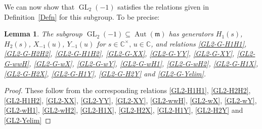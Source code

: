 \documentclass[11pt,letterpaper]{amsart}
\newcounter{thecounter}
\numberwithin{thecounter}{section}
\newtheorem{lemma}[thecounter]{Lemma}
\theoremstyle{definition}
\DeclareMathOperator{\GL}{GL}
\DeclareMathOperator{\Aut}{Aut}
\newcommand{\C}{{\mathbb C}}
\begin{document}
We can now show that $\GL_2(-1)$ satisfies the relations given in Definition~\ref{Defn} for this subgroup. To be precise:
\begin{lemma}\label{L-GL2-1}
The subgroup $\GL_2({-1})\subseteq \Aut(\mathfrak{m})$ has generators
$H_1(s)$, $H_2(s)$, $X_{-1}(u)$,  $Y_{-1}(u)$ for  $s\in\C^\times,\,u\in\C $,
and  relations \eqref{GL2-G-H1H1}, \eqref{GL2-G-H2H2}, \eqref{GL2-G-H1H2}, \eqref{GL2-G-XX}, 
\eqref{GL2-G-YY}, \eqref{GL2-G-XY}, \eqref{GL2-G-wwH}, \eqref{GL2-G-wX}, \eqref{GL2-G-wY}, \eqref{GL2-G-wH1},  
\eqref{GL2-G-wH2}, \eqref{GL2-G-H1X}, \eqref{GL2-G-H2X}, \eqref{GL2-G-H1Y},  \eqref{GL2-G-H2Y} and \eqref{GL2-G-Yelim}.
\end{lemma}

\begin{longver}
\begin{proof} These follow from the corresponding relations \eqref{GL2-H1H1}, \eqref{GL2-H2H2}, \eqref{GL2-H1H2}, \eqref{GL2-XX}, 
\eqref{GL2-YY}, \eqref{GL2-XY}, \eqref{GL2-wwH}, \eqref{GL2-wX}, \eqref{GL2-wY}, \eqref{GL2-wH1},  
\eqref{GL2-wH2}, \eqref{GL2-H1X}, \eqref{GL2-H2X}, \eqref{GL2-H1Y}, \eqref{GL2-H2Y} and \eqref{GL2-Yelim}
\end{proof}
\end{longver}
\end{document}
